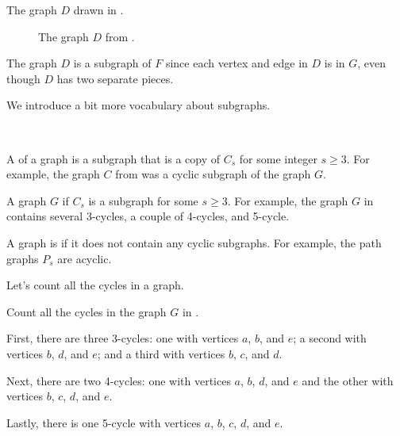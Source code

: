 \begin{exam}
\begin{apart}
            \item The graph $D$ drawn in .
                \begin{figure}[hbtp]
                    \centering
                    
                    \caption{The graph $D$ from .}
                    \label{fig_less_obv_subgraph}
                \end{figure}
                \begin{soln}
                    The graph $D$ is a subgraph of $F$ since each vertex and edge in $D$ is in $G$, even though $D$ has two separate pieces.
                \end{soln}
        \end{apart}
\end{exam}

We introduce a bit more vocabulary about subgraphs.

\begin{defn}
\label{defn_cyclic_subgraphs}
~
    \begin{apart}
        \item A  of a graph is a subgraph that is a copy of $C_s$ for some integer $s \ge 3$.  For example, the graph $C$ from  was a cyclic subgraph of the graph $G$.  
        \item A graph $G$  if $C_s$ is a subgraph for some $s \ge 3$.  For example, the graph $G$ in  contains several 3-cycles, a couple of 4-cycles, and 5-cycle.   
        \item A graph is  if it does not contain any cyclic subgraphs. For example, the path graphs $P_s$ are acyclic.
    \end{apart}  
\end{defn}

Let's count all the cycles in a graph.

\begin{exam}
\label{exam_count_cycles}
    Count all the cycles in the graph $G$ in .
        \begin{soln}
            First, there are three 3-cycles: one with vertices $a$, $b$, and $e$; a second with vertices $b$, $d$, and $e$; and a third with vertices $b$, $c$, and $d$.

            Next, there are two 4-cycles: one with vertices $a$, $b$, $d$, and $e$ and the other with vertices $b$, $c$, $d$, and $e$.

            Lastly, there is one 5-cycle with vertices $a$, $b$, $c$, $d$, and $e$.
        \end{soln}
\end{exam}

